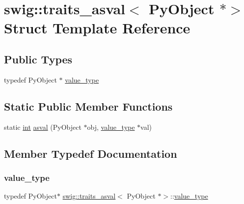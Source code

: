 \hypertarget{structswig_1_1traits__asval_3_01_py_object_01_5_4}{}\section{swig\+:\+:traits\+\_\+asval$<$ Py\+Object $\ast$$>$ Struct Template Reference}
\label{structswig_1_1traits__asval_3_01_py_object_01_5_4}
\subsection*{Public Types}
\begin{DoxyCompactItemize}
\item 
typedef Py\+Object $\ast$ \hyperlink{structswig_1_1traits__asval_3_01_py_object_01_5_4_a27a163991e96a33bcf1937a8ca435479}{value\+\_\+type}
\end{DoxyCompactItemize}
\subsection*{Static Public Member Functions}
\begin{DoxyCompactItemize}
\item 
static \hyperlink{lp__lib_8h_adeb9ec6400320e4923ac9d836d509ddb}{int} \hyperlink{structswig_1_1traits__asval_3_01_py_object_01_5_4_aca155c255a1d5d8a00141cbc502f6197}{asval} (Py\+Object $\ast$obj, \hyperlink{structswig_1_1traits__asval_3_01_py_object_01_5_4_a27a163991e96a33bcf1937a8ca435479}{value\+\_\+type} $\ast$val)
\end{DoxyCompactItemize}


\subsection{Member Typedef Documentation}
\mbox{\label{structswig_1_1traits__asval_3_01_py_object_01_5_4_a27a163991e96a33bcf1937a8ca435479}} 
\subsubsection{\texorpdfstring{value\+\_\+type}{value\_type}}
{\footnotesize\ttfamily typedef Py\+Object$\ast$ \hyperlink{structswig_1_1traits__asval}{swig\+::traits\+\_\+asval}$<$ Py\+Object $\ast$$>$\+::\hyperlink{structswig_1_1traits__asval_3_01_py_object_01_5_4_a27a163991e96a33bcf1937a8ca435479}{value\+\_\+type}}



